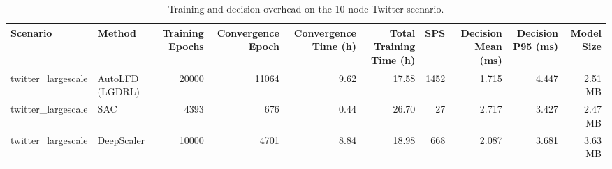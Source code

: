 \begin{table}[t]
\centering
\caption{Training and decision overhead on the 10-node Twitter scenario.}
\label{tab:training_overhead_10node}
\begin{tabular}{llrrrrrrrr}
\toprule
Scenario & Method & Training Epochs & Convergence Epoch & Convergence Time (h) & Total Training Time (h) & SPS & Decision Mean (ms) & Decision P95 (ms) & Model Size \\
\midrule
twitter\_largescale & AutoLFD (LGDRL) & 20000 & 11064 & 9.62 & 17.58 & 1452 & 1.715 & 4.447 & 2.51 MB \\
twitter\_largescale & SAC & 4393 & 676 & 0.44 & 26.70 & 27 & 2.717 & 3.427 & 2.47 MB \\
twitter\_largescale & DeepScaler & 10000 & 4701 & 8.84 & 18.98 & 668 & 2.087 & 3.681 & 3.63 MB \\
\bottomrule
\end{tabular}
\end{table}
